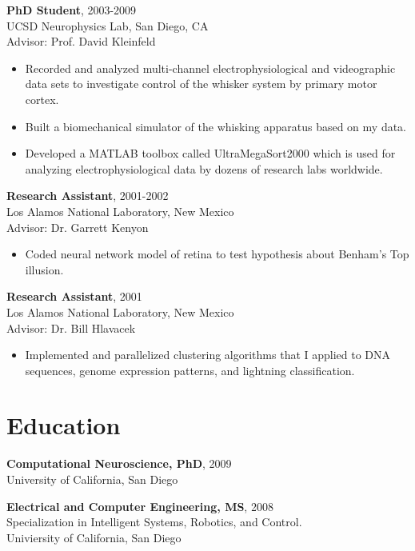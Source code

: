\documentclass[line,11pt]{res}
\begin{document}
\begin{resume}
{\bf PhD Student}, 2003-2009 \\ UCSD Neurophysics Lab, San Diego, CA \\ Advisor: Prof. David Kleinfeld
  \begin{itemize}
        \item[] Recorded and analyzed multi-channel electrophysiological and videographic data sets to investigate control of the whisker system by primary motor cortex.
         \item[] Built a biomechanical simulator of the whisking apparatus based on my data.
        \item[] Developed a MATLAB toolbox called UltraMegaSort2000 which is used for analyzing electrophysiological data by dozens of research labs worldwide.
 \end{itemize}    
    
   {\bf Research Assistant}, 2001-2002 \\ Los Alamos National Laboratory, New Mexico  
   \\ Advisor: Dr. Garrett Kenyon
  \begin{itemize}
        \item[] Coded neural network model of retina to test hypothesis about Benham's Top illusion.
  \end{itemize}

   {\bf Research Assistant}, 2001 \\ Los Alamos National Laboratory, New Mexico  
   \\ Advisor: Dr. Bill Hlavacek
  \begin{itemize}
  \item[] Implemented and parallelized clustering algorithms that I applied to DNA sequences, genome expression patterns, and lightning classification. 
  \end{itemize}

\section{Education}
\vspace{0.1in} 
 
 	\textbf{Computational Neuroscience, PhD}, 2009 \\
    University of California, San Diego
 
 	\textbf{Electrical and Computer Engineering, MS}, 2008 \\    
    Specialization in Intelligent Systems, Robotics, and Control.\\
    Univiersity of California, San Diego
    

\end{resume}
\end{document}
